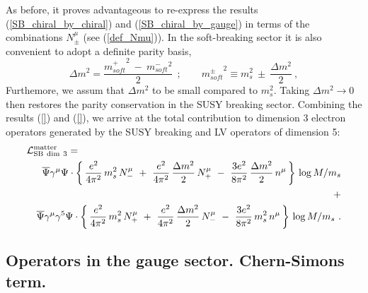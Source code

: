 \documentclass[12pt]{revtex4}
\begin{document}
As before, it proves advantageous to re-express the results (\ref{SB_chiral_by_chiral})
and (\ref{SB_chiral_by_gauge}) in terms of the combinations
$ N_\pm^\mu $ (see (\ref{def_Nmu})).  In the soft-breaking sector it is also convenient 
to adopt a definite parity basis,
\begin{equation}
\Delta m^2 = \frac{ {m_{soft}^+}^2 ~ - ~ {m_{soft}^-}^2 }
  {                  2                  }~~;
\qquad
{m_{soft}^\pm}^2 \equiv m_s^2 ~\pm~ \frac{\Delta m^2}{2}~,
\end{equation}
Furthemore, we assum that  $ \Delta m^2 $ to be small compared to $m_s^2$. 
Taking $ \Delta m^2 \to 0 $ then restores the parity conservation 
in the SUSY breaking sector. 
Combining the results (\ref{}) and (\ref{}), we arrive at the total contribution 
to dimension 3 electron operators generated by the SUSY breaking and LV operators of dimension 5:
\begin{eqnarray}
\nonumber
\lefteqn{
        \mathcal{L}_{\rm{SB\ dim\ 3}}^{\rm matter} = 
} \\
\nonumber
        &&
\overline{\Psi} \gamma^\mu \Psi \cdot
\left\{\,
        \frac{e^2}{4\pi^2}\, m_s^2\, N_-^\mu 
~+~
\frac{e^2}{4\pi^2}\, \frac{\Delta m^2}{2}\, N_+^\mu 
~-~
\frac{3e^2}{8\pi^2}\, \frac{\Delta m^2}{2}\, n^\mu
       \,
\right\}\, \log M/m_s \\
\label{LV_induced_dim3}
&& \qquad\qquad\qquad\qquad\qquad\qquad\qquad\ + \\
\nonumber
&&
\overline{\Psi} \gamma^\mu \gamma^5 \Psi \cdot
\left\{\,
        \frac{e^2}{4\pi^2}\, m_s^2\, N_+^\mu 
~+~
\frac{e^2}{4\pi^2}\, \frac{\Delta m^2}{2}\, N_-^\mu 
~-~
\frac{3e^2}{8\pi^2}\, m_s^2\, n^\mu
       \,
\right\}\, \log M/m_s~.
\end{eqnarray}

\subsection{Operators in the gauge sector. Chern-Simons term.}
\label{SB_gauge_sector}
    
\end{document}
